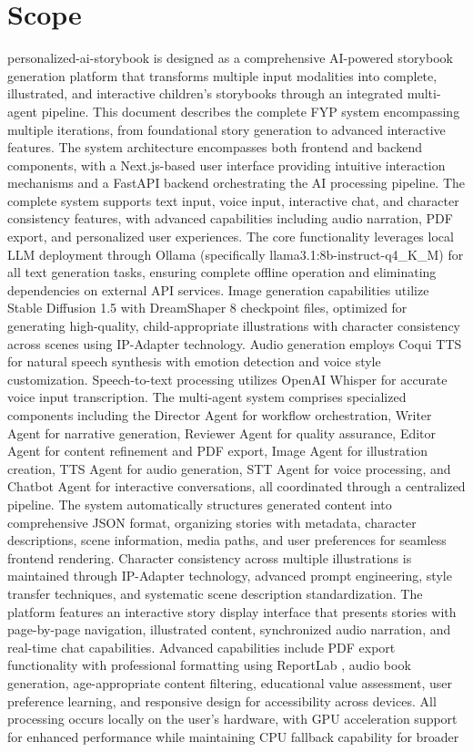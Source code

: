 \section{Scope}
personalized-ai-storybook is designed as a comprehensive AI-powered storybook generation platform that transforms multiple input modalities into complete, illustrated, and interactive children's storybooks through an integrated multi-agent pipeline. This document describes the complete FYP system encompassing multiple iterations, from foundational story generation to advanced interactive features. The system architecture encompasses both frontend and backend components, with a Next.js-based \cite{nextjs2024} user interface providing intuitive interaction mechanisms and a FastAPI \cite{fastapi2024} backend orchestrating the AI processing pipeline. The complete system supports text input, voice input, interactive chat, and character consistency features, with advanced capabilities including audio narration, PDF export, and personalized user experiences. The core functionality leverages local LLM deployment through Ollama (specifically llama3.1:8b-instruct-q4\_K\_M) for all text generation tasks, ensuring complete offline operation and eliminating dependencies on external API services. Image generation capabilities utilize Stable Diffusion 1.5 with DreamShaper 8 checkpoint files, optimized for generating high-quality, child-appropriate illustrations with character consistency across scenes using IP-Adapter technology. Audio generation employs Coqui TTS \cite{coqui2024} for natural speech synthesis with emotion detection and voice style customization. Speech-to-text processing utilizes OpenAI Whisper \cite{whisper2023} for accurate voice input transcription. The multi-agent system comprises specialized components including the Director Agent for workflow orchestration, Writer Agent for narrative generation, Reviewer Agent for quality assurance, Editor Agent for content refinement and PDF export, Image Agent for illustration creation, TTS Agent for audio generation, STT Agent for voice processing, and Chatbot Agent for interactive conversations, all coordinated through a centralized pipeline. The system automatically structures generated content into comprehensive JSON format, organizing stories with metadata, character descriptions, scene information, media paths, and user preferences for seamless frontend rendering. Character consistency across multiple illustrations is maintained through IP-Adapter technology, advanced prompt engineering, style transfer techniques, and systematic scene description standardization. The platform features an interactive story display interface that presents stories with page-by-page navigation, illustrated content, synchronized audio narration, and real-time chat capabilities. Advanced capabilities include PDF export functionality with professional formatting using ReportLab \cite{reportlab2024}, audio book generation, age-appropriate content filtering, educational value assessment, user preference learning, and responsive design for accessibility across devices. All processing occurs locally on the user's hardware, with GPU acceleration support for enhanced performance while maintaining CPU fallback capability for broader 
